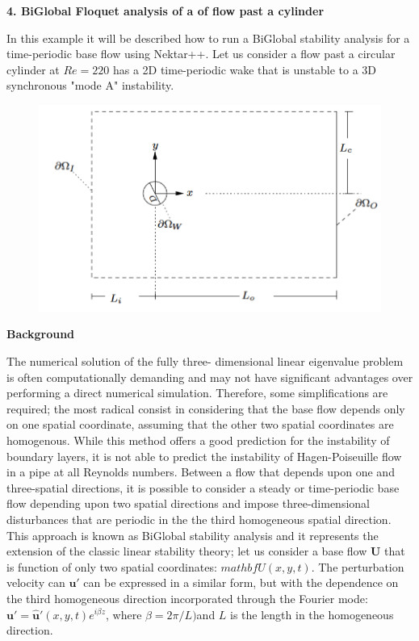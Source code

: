 \textbf{4. BiGlobal Floquet analysis of a of flow past a cylinder}

 In this example it will be described how to run a BiGlobal stability analysis for a time-periodic base flow using Nektar++. Let us consider a flow past a circular cylinder at $Re=220$ has a 2D time-periodic wake that is unstable to a 3D synchronous "mode A" instability. 
 
 \begin{figure}[!htbp]
\centering
 {\includegraphics[width=1 \textwidth]{Figures/cylinder_geo}}
   \caption {}
\end{figure}

  
\textbf{Background}

The numerical solution of the fully three- dimensional linear eigenvalue problem is often computationally demanding and may not have significant advantages over performing a direct numerical simulation. Therefore, some simplifications are required; the most radical consist in considering that the base flow depends only on one spatial coordinate, assuming that the other two spatial coordinates are homogenous.  While this method offers a good prediction for the instability of boundary layers, it is not able to predict the instability of Hagen-Poiseuille flow in a pipe at all Reynolds numbers.  Between a flow that depends upon one and three-spatial directions, it is possible to consider a steady or time-periodic base flow depending upon two spatial directions and impose three-dimensional disturbances that are periodic in the the third homogeneous  spatial direction. This approach is known as BiGlobal stability analysis and it represents the extension of the classic linear stability theory; let us consider a base flow $\mathbf{U}$ that is function of only two spatial coordinates: $mathbf{U}(x, y,t)$. The perturbation velocity can $\mathbf{u'}$ can be expressed in a similar form, but with the dependence on the third homogeneous direction incorporated through the Fourier mode: $\mathbf{u'}=\mathbf{\hat{u}'}(x, y, t) e^{i \beta z}$, where $\beta=2\pi/L)$and $L$ is the length in the homogeneous direction.

